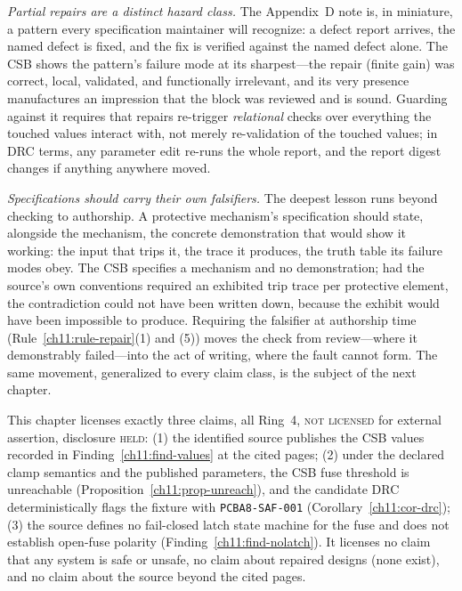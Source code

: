 \emph{Partial repairs are a distinct hazard class.} The Appendix~D note is, in miniature, a pattern every specification maintainer will recognize: a defect report arrives, the named defect is fixed, and the fix is verified against the named defect alone. The CSB shows the pattern's failure mode at its sharpest---the repair (finite gain) was correct, local, validated, and functionally irrelevant, and its very presence manufactures an impression that the block was reviewed and is sound. Guarding against it requires that repairs re-trigger \emph{relational} checks over everything the touched values interact with, not merely re-validation of the touched values; in DRC terms, any parameter edit re-runs the whole report, and the report digest changes if anything anywhere moved.

\emph{Specifications should carry their own falsifiers.} The deepest lesson runs beyond checking to authorship. A protective mechanism's specification should state, alongside the mechanism, the concrete demonstration that would show it working: the input that trips it, the trace it produces, the truth table its failure modes obey. The CSB specifies a mechanism and no demonstration; had the source's own conventions required an exhibited trip trace per protective element, the contradiction could not have been written down, because the exhibit would have been impossible to produce. Requiring the falsifier at authorship time (Rule~\ref{ch11:rule-repair}(1) and (5)) moves the check from review---where it demonstrably failed---into the act of writing, where the fault cannot form. The same movement, generalized to every claim class, is the subject of the next chapter.

\begin{boundary}\label{ch11:boundary-final}
This chapter licenses exactly three claims, all Ring~4, \textsc{not licensed} for external assertion, disclosure \textsc{held}: (1) the identified source publishes the CSB values recorded in Finding~\ref{ch11:find-values} at the cited pages; (2) under the declared clamp semantics and the published parameters, the CSB fuse threshold is unreachable (Proposition~\ref{ch11:prop-unreach}), and the candidate DRC deterministically flags the fixture with \texttt{PCBA8-SAF-001} (Corollary~\ref{ch11:cor-drc}); (3) the source defines no fail-closed latch state machine for the fuse and does not establish open-fuse polarity (Finding~\ref{ch11:find-nolatch}). It licenses no claim that any system is safe or unsafe, no claim about repaired designs (none exist), and no claim about the source beyond the cited pages.
\end{boundary}
